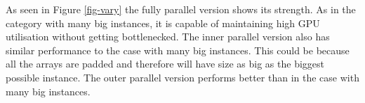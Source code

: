 As seen in Figure \ref{fig-vary} the fully parallel version shows its strength. As in the category with many big instances, it is capable of maintaining high GPU utilisation without getting bottlenecked. The inner parallel version also has similar performance to the case with many big instances. This could be because all the arrays are padded and therefore will have size as big as the biggest possible instance. The outer parallel version performs better than in the case with many big instances.